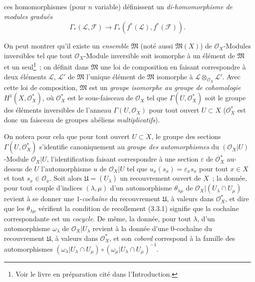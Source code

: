 \begin{env}[5.4.6]

ces homomorphismes (pour $n$ variable) définissent un
\emph{di-homomorphisme de modules gradués}
\[
  \Gamma_*(\mathcal{L},\mathcal{F})
  \longrightarrow
  \Gamma_*(f^*(\mathcal{L}),f^*(\mathcal{F})).
\]
\end{env}

\begin{env}[5.4.7]
\label{0.5.4.7-fr}
On peut montrer qu'il existe un \emph{ensemble} $\mathfrak{M}$ (noté aussi
$\mathfrak{M}(X)$) de $\mathcal{O}_X$-Modules inversibles tel que tout
$\mathcal{O}_X$-Module inversible soit isomorphe à un élément de
$\mathfrak{M}$ et un seul\footnote{Voir le livre en préparation cité dans
l'Introduction.}~; on définit dans $\mathfrak{M}$ une loi de composition en
faisant correspondre à deux éléments $\mathcal{L}$, $\mathcal{L}'$ de
$\mathfrak{M}$ l'unique élément de $\mathfrak{M}$ isomorphe à
$\mathcal{L}\otimes_{\mathcal{O}_X}\mathcal{L}'$. Avec cette loi de
composition, $\mathfrak{M}$ est un \emph{groupe isomorphe au groupe de
cohomologie} $H^1(X,\mathcal{O}_X^*)$, où $\mathcal{O}_X^*$ est le
sous-faisceau de $\mathcal{O}_X$ tel que $\Gamma(U,\mathcal{O}_X^*)$ soit le
groupe des éléments inversibles de l'anneau $\Gamma(U,\mathcal{O}_X)$ pour
tout ouvert $U\subset X$ ($\mathcal{O}_X^*$ est donc un faisceau de groupes
abéliens \emph{multiplicatifs}).

On notera pour cela que pour tout ouvert $U\subset X$, le groupe des sections
$\Gamma(U,\mathcal{O}_X^*)$ s'identifie canoniquement au \emph{groupe des
automorphismes} du $(\mathcal{O}_X|U)$-Module $\mathcal{O}_X|U$,
l'identification faisant correspondre à une section $\varepsilon$ de
$\mathcal{O}_X^*$ au-dessus de $U$ l'automorphisme $u$ de $\mathcal{O}_X|U$
tel que $u_x(s_x)=\varepsilon_xs_x$ pour tout $x\in X$ et tout
$s_x\in\mathcal{O}_x$. Soit alors $\mathfrak{U}=(U_\lambda)$ un recouvrement
ouvert de $X$~; la donnée, pour tout couple d'indices $(\lambda,\mu)$ d'un
automorphisme $\theta_{\lambda\mu}$ de
$\mathcal{O}_X|(U_\lambda\cap U_\mu)$ revient à se donner une
$1$-\emph{cochaîne} du recouvrement $\mathfrak{U}$, à valeurs dans
$\mathcal{O}_X^*$, et dire que les $\theta_{\lambda\mu}$ vérifient la
condition de recollement (3.3.1) signifie que la cochaîne correspondante est
un \emph{cocycle}. De même, la donnée, pour tout $\lambda$, d'un automorphisme
$\omega_\lambda$ de $\mathcal{O}_X|U_\lambda$ revient à la donnée d'une
$0$-cochaîne du recouvrement $\mathfrak{U}$, à valeurs dans
$\mathcal{O}_X^*$, et son \emph{cobord} correspond à la famille des
automorphismes
$(\omega_\lambda|U_\lambda\cap U_\mu)\circ
 (\omega_\mu|U_\lambda\cap U_\mu)^{-1}$.


\end{env}
